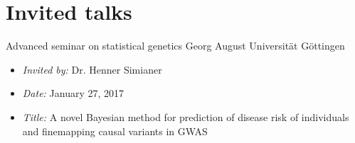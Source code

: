 \section{Invited talks}
        {Advanced seminar on statistical genetics}
        {Georg August Universit\"at}
        {G\"ottingen}
        {}
        {\vspace{-1.0em}%
         \begin{itemize}%
         \setlength{\itemsep}{0.35em}
              \item {\itshape\color{color2} Invited by:} %
                    Dr. Henner Simianer
              \item {\itshape\color{color2} Date:} January 27, 2017
              \item {\itshape\color{color2} Title:} A novel Bayesian method for prediction of disease risk of individuals and finemapping causal variants in GWAS
         \end{itemize}
        }
